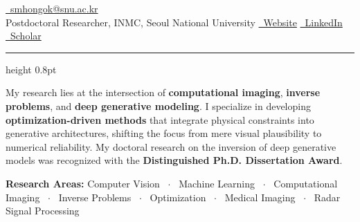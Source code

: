\documentclass[a4paper,11pt]{article}
\begin{document}
\noindent
{} \hfill \href{mailto:smhongok@snu.ac.kr}{\faEnvelope \ smhongok@snu.ac.kr} \\
{\large Postdoctoral Researcher, INMC, Seoul National University} \hfill \href{https://smhongok.github.io}{\faGlobe \ Website} \quad \href{https://linkedin.com/in/sm-hong}{\faLinkedin \ LinkedIn} \quad \href{https://scholar.google.com/citations?user=YOUR_ID}{\faGraduationCap \ Scholar}

\vspace{0.5ex}
\hrule height 0.8pt
\vspace{1ex}

\noindent
My research lies at the intersection of \textbf{computational imaging}, \textbf{inverse problems}, and \textbf{deep generative modeling}.
I specialize in developing \textbf{optimization-driven methods} that integrate physical constraints into generative architectures, shifting the focus from mere visual plausibility to numerical reliability.
My doctoral research on the inversion of deep generative models was recognized with the \textbf{Distinguished Ph.D. Dissertation Award}.

\vspace{2pt}

\noindent\textbf{Research Areas:}
Computer Vision \ $\cdot$ \ Machine Learning \ $\cdot$ \ Computational Imaging \ $\cdot$ \ Inverse Problems \ $\cdot$ \ Optimization \ $\cdot$ \ Medical Imaging \ $\cdot$ \ Radar Signal Processing

\vspace{2pt}
\end{document}

